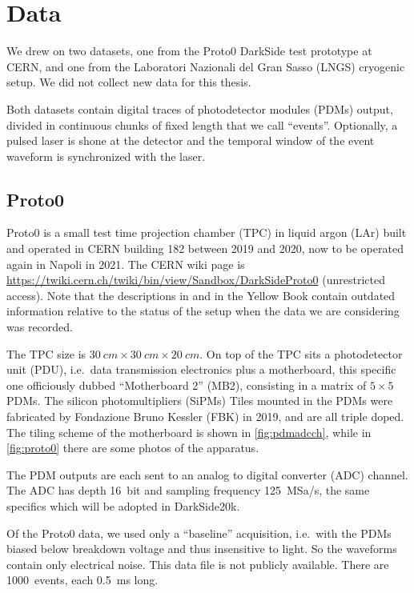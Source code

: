\chapter{Data}
\label{ch:data}

We drew on two datasets, one from the Proto0 DarkSide test prototype at CERN,
and one from the Laboratori Nazionali del Gran Sasso (LNGS) cryogenic setup.
We did not collect new data for this thesis.

Both datasets contain digital traces of photodetector modules (PDMs) output,
divided in continuous chunks of fixed length that we call ``events''.
Optionally, a pulsed laser is shone at the detector and the temporal window
of the event waveform is synchronized with the laser.

\section{Proto0}

Proto0 is a small test time projection chamber (TPC) in liquid argon (LAr)
built and operated in CERN building 182 between 2019 and 2020, now to be
operated again in Napoli in 2021. The CERN wiki page is
\url{https://twiki.cern.ch/twiki/bin/view/Sandbox/DarkSideProto0} (unrestricted
access). Note that the descriptions in \cite[sec.~4.3.2]{luzzi2020} and in the
Yellow Book \cite[65]{aalseth2018} contain outdated information relative to the
status of the setup when the data we are considering was recorded.

The TPC size is $\SI{30}{cm} \times \SI{30}{cm} \times \SI{20}{cm}$. On top of
the TPC sits a photodetector unit (PDU), i.e.\ data transmission electronics
plus a motherboard, this specific one officiously dubbed ``Motherboard 2''
(MB2), consisting in a matrix of $5\times 5$ PDMs. The silicon photomultipliers
(SiPMs) Tiles mounted in the PDMs were fabricated by Fondazione Bruno Kessler
(FBK) in 2019, and are all triple doped. The tiling scheme of the motherboard
is shown in \autoref{fig:pdmadcch}, while in \autoref{fig:proto0} there are
some photos of the apparatus.

The PDM outputs are each sent to an analog to digital converter (ADC) channel.
The ADC has depth \SI{16}{bit} and sampling frequency \SI{125}{MSa/s}, the same
specifics which will be adopted in DarkSide20k.

Of the Proto0 data, we used only a ``baseline'' acquisition, i.e.\ with the
PDMs biased below breakdown voltage and thus insensitive to light. So the
waveforms contain only electrical noise. This data file is not publicly
available. There are 1000~events, each \SI{0.5}{ms} long.


